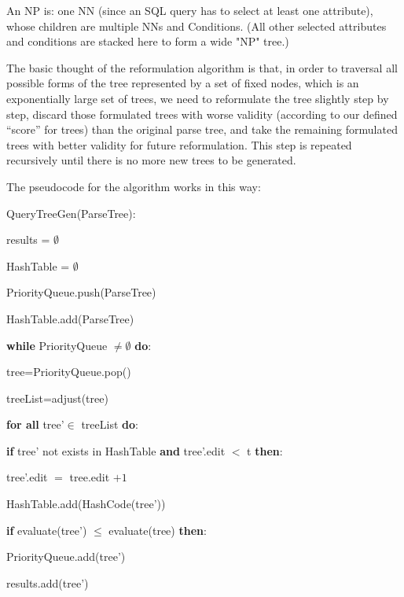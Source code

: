 \documentclass[twocolumn]{article}
\begin{document}
\begin{enumerate}
{	An NP is: one NN (since an SQL query has to select at least one attribute), whose children are multiple NNs and Conditions. (All other selected attributes and conditions are stacked here to form a wide "NP" tree.)}
	
	The basic thought of the reformulation algorithm is that, in order to traversal all possible forms of the tree represented by a set of fixed nodes, which is an exponentially large set of trees, we need to reformulate the tree slightly step by step, discard those formulated trees with worse validity (according to our defined ``score'' for trees) than the original parse tree, and take the remaining formulated trees with better validity for future reformulation. This step is repeated recursively until there is no more new trees to be generated.
	
	The pseudocode for the algorithm works in this way:
	
	{\small 
	QueryTreeGen(ParseTree):
		
	results = $\emptyset$
	
	HashTable = $\emptyset$
	
	PriorityQueue.push(ParseTree)
	
	HashTable.add(ParseTree)
	
	\textbf{while} PriorityQueue $\neq\emptyset$ \textbf{do}:
	
	\hspace{1em} tree=PriorityQueue.pop()
	
	\hspace{1em} treeList=adjust(tree)
	
	\hspace{1em} \textbf{for all} tree'$\in$ treeList \textbf{do}:
	
	\hspace{2em} \textbf{if} tree' not exists in HashTable \textbf{and} tree'.edit $<$ t \textbf{then}:
	
	\hspace{3em} tree'.edit $=$ tree.edit $+1$
	
	\hspace{3em} HashTable.add(HashCode(tree'))
	
	\hspace{3em} \textbf{if} evaluate(tree') $\leq$ evaluate(tree) \textbf{then}:
	
	\hspace{4em} PriorityQueue.add(tree')
	
	\hspace{4em} results.add(tree')
	
}
\end{enumerate}
\end{document}
